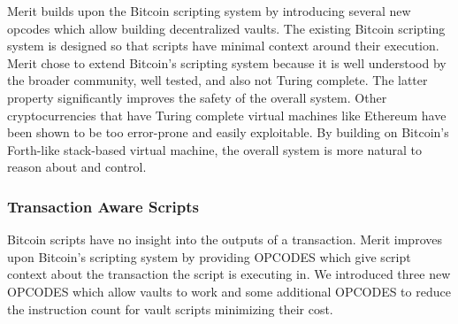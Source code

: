 \documentclass{article}
\begin{document}
Merit builds upon the Bitcoin scripting system by introducing several new opcodes
which allow building decentralized vaults. The existing Bitcoin scripting system
is designed so that scripts have minimal context around their execution. Merit
chose to extend Bitcoin's scripting system because it is well understood by the
broader community, well tested, and also not Turing complete.  The latter property
significantly improves the safety of the overall system.  Other cryptocurrencies
that have Turing complete virtual machines like Ethereum have been shown to be too
error-prone and easily exploitable. By building on Bitcoin's Forth-like stack-based
virtual machine, the overall system is more natural to reason about and control.

\subsubsection{Transaction Aware Scripts}
Bitcoin scripts have no insight into the outputs of a transaction.
Merit improves upon Bitcoin's scripting system by providing OPCODES which give
script context about the transaction the script is executing in. We introduced
three new OPCODES which allow vaults to work and some additional OPCODES to reduce
the instruction count for vault scripts minimizing their cost.
\end{document}
